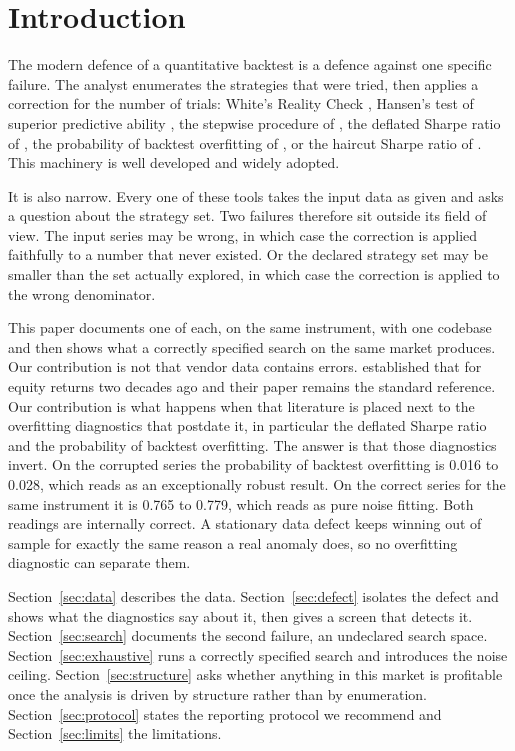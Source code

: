 \documentclass[10pt]{article}
\begin{document}
\section{Introduction}

The modern defence of a quantitative backtest is a defence against one specific failure.
The analyst enumerates the strategies that were tried, then applies a correction for the
number of trials: White's Reality Check \citep{white2000}, Hansen's test of superior
predictive ability \citep{hansen2005}, the stepwise procedure of \citet{romanowolf2005},
the deflated Sharpe ratio of \citet{baileylopez2014}, the probability of backtest
overfitting of \citet{bailey2017}, or the haircut Sharpe ratio of \citet{harveyliu2015}.
This machinery is well developed and widely adopted.

It is also narrow. Every one of these tools takes the input data as given and asks a
question about the strategy set. Two failures therefore sit outside its field of view. The
input series may be wrong, in which case the correction is applied faithfully to a number
that never existed. Or the declared strategy set may be smaller than the set actually
explored, in which case the correction is applied to the wrong denominator.

This paper documents one of each, on the same instrument, with one codebase and then
shows what a correctly specified search on the same market produces. Our contribution is
not that vendor data contains errors. \citet{inceporter2006} established that for equity
returns two decades ago and their paper remains the standard reference. Our contribution
is what happens when that literature is placed next to the overfitting diagnostics that
postdate it, in particular the deflated Sharpe ratio and the probability of backtest
overfitting. The answer is that those diagnostics invert. On the corrupted series the probability of backtest
overfitting is 0.016 to 0.028, which reads as an exceptionally robust result. On the
correct series for the same instrument it is 0.765 to 0.779, which reads as pure noise
fitting. Both readings are internally correct. A stationary data defect keeps winning out
of sample for exactly the same reason a real anomaly does, so no overfitting diagnostic
can separate them.

Section~\ref{sec:data} describes the data. Section~\ref{sec:defect} isolates the defect
and shows what the diagnostics say about it, then gives a screen that detects it.
Section~\ref{sec:search} documents the second failure, an undeclared search space.
Section~\ref{sec:exhaustive} runs a correctly specified search and introduces the noise
ceiling. Section~\ref{sec:structure} asks whether anything in this market is profitable
once the analysis is driven by structure rather than by enumeration.
Section~\ref{sec:protocol} states the reporting protocol we recommend and
Section~\ref{sec:limits} the limitations.
\end{document}
